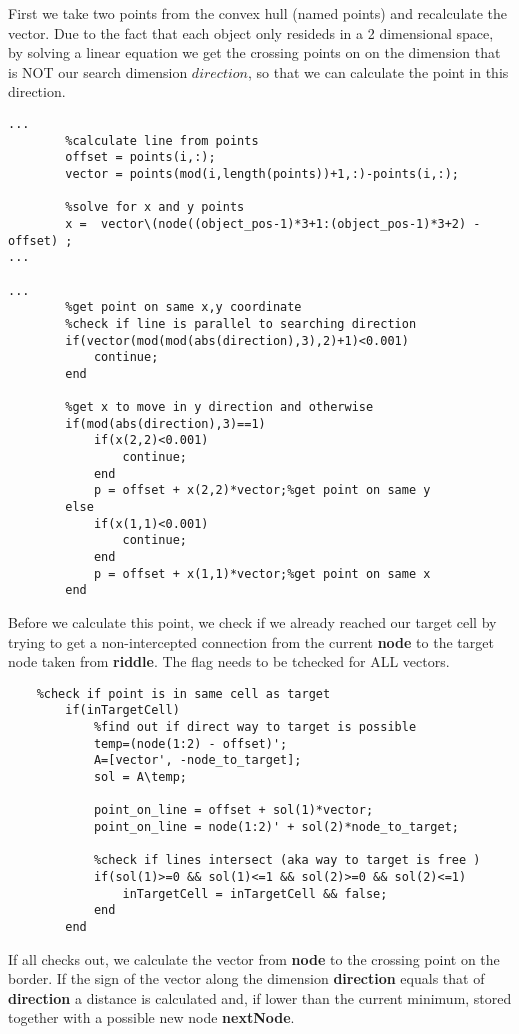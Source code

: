 First we take two points from the convex hull (named points) and recalculate the vector. Due to the fact that each object only resideds in a 2 dimensional space, by solving a linear equation we get the crossing points on on the dimension that is NOT our search dimension $direction$, so that we can calculate the point in this direction.
\begin{lstlisting}
...
        %calculate line from points
        offset = points(i,:);
        vector = points(mod(i,length(points))+1,:)-points(i,:);

        %solve for x and y points
        x =  vector\(node((object_pos-1)*3+1:(object_pos-1)*3+2) - offset) ;
...    
    
...        
        %get point on same x,y coordinate
        %check if line is parallel to searching direction
        if(vector(mod(mod(abs(direction),3),2)+1)<0.001)
            continue;
        end

        %get x to move in y direction and otherwise
        if(mod(abs(direction),3)==1)
            if(x(2,2)<0.001)
                continue;
            end
            p = offset + x(2,2)*vector;%get point on same y
        else
            if(x(1,1)<0.001)
                continue;
            end
            p = offset + x(1,1)*vector;%get point on same x
        end
 \end{lstlisting}
Before we calculate this point, we check if we already reached our target cell by trying to get a non-intercepted connection from the current \textbf{node} to the target node taken from \textbf{riddle}. The flag needs to be tchecked for ALL vectors.       
\begin{lstlisting}
    %check if point is in same cell as target
        if(inTargetCell)
            %find out if direct way to target is possible
            temp=(node(1:2) - offset)';
            A=[vector', -node_to_target];
            sol = A\temp;
            
            point_on_line = offset + sol(1)*vector;
            point_on_line = node(1:2)' + sol(2)*node_to_target;
            
            %check if lines intersect (aka way to target is free )
            if(sol(1)>=0 && sol(1)<=1 && sol(2)>=0 && sol(2)<=1)
                inTargetCell = inTargetCell && false;
            end    
        end
\end{lstlisting}
If all checks out, we calculate the vector from \textbf{node} to the crossing point on the border. If the sign of the vector along the dimension \textbf{direction} equals that of \textbf{direction} a distance is calculated and, if lower than the current minimum, stored together with a possible new node \textbf{nextNode}.

